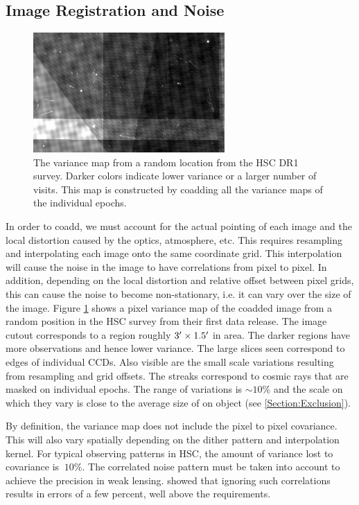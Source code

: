 \documentclass[fleqn,useAMS,usenatbib]{mnras}
\begin{document}
\subsection{Image Registration and Noise}
\label{Subsection:Registration}

\begin{figure}
\includegraphics[width=0.65\textwidth]{CoaddNoise.png}
\caption{
The variance map from a random location from the HSC DR1 survey.  Darker colors indicate lower variance or a larger number of visits.  This map is constructed by coadding all the variance maps of the individual epochs.
}
\label{fig:noise}
\end{figure}

In order to coadd, we must account for the actual pointing of each image and the local distortion caused by the optics, atmosphere, etc.  This requires resampling and interpolating each image onto the same coordinate grid.  This interpolation will cause the noise in the image to have correlations from pixel to pixel.  In addition, depending on the local distortion and relative offset between pixel grids, this can cause the noise to become non-stationary, i.e. it can vary over the size of the image.  Figure \ref{fig:noise} shows a pixel variance map of the coadded image from a random position in the HSC survey \cite{HSC_DR1} from their first data release.  The image cutout corresponds to a region roughly $3\hbox{$^\prime$} \times 1.5\hbox{$^\prime$}$ in area.  The darker regions have more observations and hence lower variance.  The large slices seen correspond to edges of individual CCDs.  Also visible are the small scale variations resulting from resampling and grid offsets.  The streaks correspond to cosmic rays that are masked on individual epochs.  The range of variations is $\sim10\%$ and the scale on which they vary is close to the average size of on object (see \ref{Section:Exclusion}).


By definition, the variance map does not include the pixel to pixel covariance.  This will also vary spatially depending on the dither pattern and interpolation kernel.  For typical observing patterns in HSC, the amount of variance lost to covariance is $~10\%$.  The correlated noise pattern must be taken into account to achieve the precision in weak lensing. \cite{Gurvich2016} showed that ignoring such correlations results in errors of a few percent, well above the requirements.  
\end{document}
